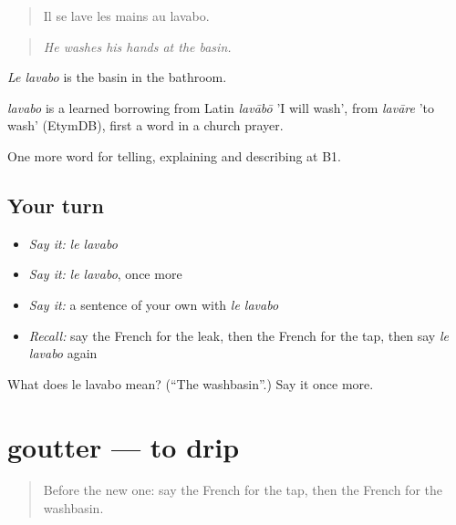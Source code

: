 \begin{quote}
Il se lave les mains au lavabo.
\end{quote}

\begin{quote}
\emph{He washes his hands at the basin.}
\end{quote}

\emph{Le lavabo} is the basin in the bathroom.

\begin{cousinweb}
\emph{lavabo} is a learned borrowing from Latin \emph{lavābō} 'I will wash', from \emph{lavāre} 'to wash' (EtymDB), first a word in a church prayer.
\end{cousinweb}

\begin{grammarlens}[title={What you've built}]
One more word for telling, explaining and describing at B1.
\end{grammarlens}

\subsection*{Your turn}
\begin{itemize}
\raggedright
  \item \emph{Say it:} \emph{le lavabo}
  \item \emph{Say it:} \emph{le lavabo}, once more
  \item \emph{Say it:} a sentence of your own with \emph{le lavabo}
  \item \emph{Recall:} say the French for the leak, then the French for the tap, then say \emph{le lavabo} again
\end{itemize}

\begin{tcolorbox}[breakable,colback=teal!4,colframe=teal!35!black,title={Before you move on}]
What does le lavabo mean? (\textquotedblleft{}The washbasin\textquotedblright{}.) Say it once more.
\end{tcolorbox}
\section[goutter]{goutter — to drip}

\label{lesson:FR-C428-goutter}



\begin{quote}
Before the new one: say the French for the tap, then the French for the washbasin.
\end{quote}

